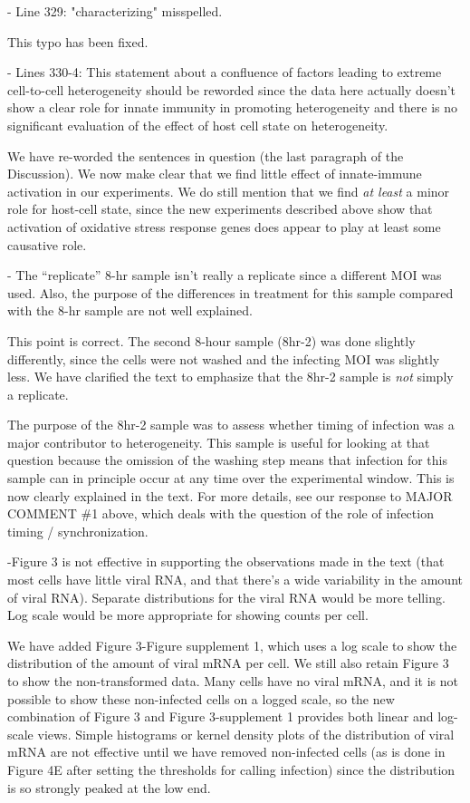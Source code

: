 \documentclass[11pt, oneside]{article}   	%
\begin{document}
- Line 329: "characterizing" misspelled. 

{\color{black}
This typo has been fixed.
}

- Lines 330-4: This statement about a confluence of factors leading to extreme cell-to-cell heterogeneity should be reworded since the data here actually doesn't show a clear role for innate immunity in promoting heterogeneity and there is no significant evaluation of the effect of host cell state on heterogeneity. 

{\color{black} 
We have re-worded the sentences in question (the last paragraph of the Discussion).
We now make clear that we find little effect of innate-immune activation in our experiments.
We do still mention that we find \emph{at least} a minor role for host-cell state, since the new experiments described above show that activation of oxidative stress response genes does appear to play at least some causative role.
}

- The ``replicate'' 8-hr sample isn't really a replicate since a different MOI was used. Also, the purpose of the differences in treatment for this sample compared with the 8-hr sample are not well explained. 

{\color{black}
This point is correct.
The second 8-hour sample (8hr-2) was done slightly differently, since the cells were not washed and the infecting MOI was slightly less.
We have clarified the text to emphasize that the 8hr-2 sample is \emph{not} simply a replicate.

The purpose of the 8hr-2 sample was to assess whether timing of infection was a major contributor to heterogeneity.
This sample is useful for looking at that question because the omission of the washing step means that infection for this sample can in principle occur at any time over the experimental window.
This is now clearly explained in the text.
For more details, see our response to MAJOR COMMENT \#1 above, which deals with the question of the role of infection timing / synchronization.
}

-Figure 3 is not effective in supporting the observations made in the text (that most cells have little viral RNA, and that there's a wide variability in the amount of viral RNA). Separate distributions for the viral RNA would be more telling. Log scale would be more appropriate for showing counts per cell. 

{\color{black} 
We have added Figure 3-Figure supplement 1, which uses a log scale to show the distribution of the amount of viral mRNA per cell.
We still also retain Figure 3 to show the non-transformed data.
Many cells have no viral mRNA, and it is not possible to show these non-infected cells on a logged scale, so the new combination of Figure 3 and Figure 3-supplement 1 provides both linear and log-scale views.
Simple histograms or kernel density plots of the distribution of viral mRNA are not effective until we have removed non-infected cells (as is done in Figure 4E after setting the thresholds for calling infection) since the distribution is so strongly peaked at the low end.
}
\end{document}
